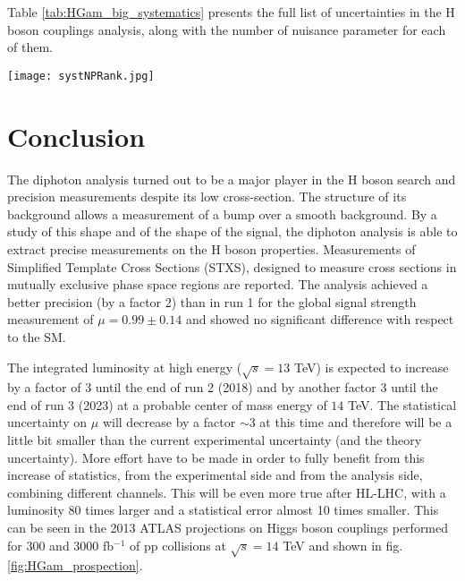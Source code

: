   \label{sec:org5b8bbd9}
Table \ref{tab:HGam_big_systematics} presents the full list of uncertainties in the H boson couplings analysis, along with the number of nuisance parameter for each of them.


\begin{table}[h!]
  \begin{center}
    \texttt{[image: systNPRank.jpg]}
\caption{Summary of sources of systematic uncertainty $\sigma_i$ ($i$ is the index to each of the unique nuisance parameters~$\theta$);
the factor in the likelihood function ${F_\mathrm{G}(\sigma,\theta)}$ or ${F_\mathrm{LN}(\sigma,\theta)}$
that implements their impact on signal yields,
mass resolution and scale, and the spurious signals resulting from the background parameterization.%
When acting on $N_\mathrm{S}^\mathrm{tot}$ the  uncertainty value is  the same for  all processes,
whereas  the uncertainty has a different value for each signal process for  the case  denoted~$N_\mathrm{S}^{p}$.
\cite{ATLAS-CONF-2017-045}}
\label{tab:HGam_big_systematics}
\end{center}
\end{table}



\section{Conclusion}
\label{sec:orgffb6129}
The diphoton analysis turned out to be a major player in the H boson search and precision measurements despite its low cross-section.
The structure of its background allows a measurement of a bump over a smooth background.
By a study of this shape and of the shape of the signal, the diphoton analysis is able to extract precise measurements on the H boson properties.
Measurements of Simplified Template Cross Sections (STXS), designed to measure cross sections in mutually exclusive phase space regions are reported.
The analysis achieved a better precision (by a factor 2) than in run 1 for the global signal strength measurement of $\mu=0.99\pm 0.14$ and showed no significant difference with respect to the SM.

The integrated luminosity at high energy ($\sqrt{s}=13$ TeV) is expected to increase by a factor of 3 until the end of run 2 (2018) and by another factor 3 until the end of run 3 (2023) at a probable center of mass energy of $14$ TeV.
The statistical uncertainty on $\mu$ will decrease by a factor $\sim 3$ at this time and therefore will be a little bit smaller than the current experimental uncertainty (and the theory uncertainty).
More effort have to be made in order to fully benefit from this increase of statistics, from the experimental side and from the analysis side, combining different channels.
This will be even more true after HL-LHC, with a luminosity 80 times larger and a statistical error almost 10 times smaller.
This can be seen in the 2013 ATLAS projections on Higgs boson couplings performed for 300 and 3000 fb$^{-1}$ of pp collisions at $\sqrt{s}=14$ TeV \cite{ATL-PHYS-PUB-2013-014} and shown in fig. \ref{fig:HGam_prospection}.

